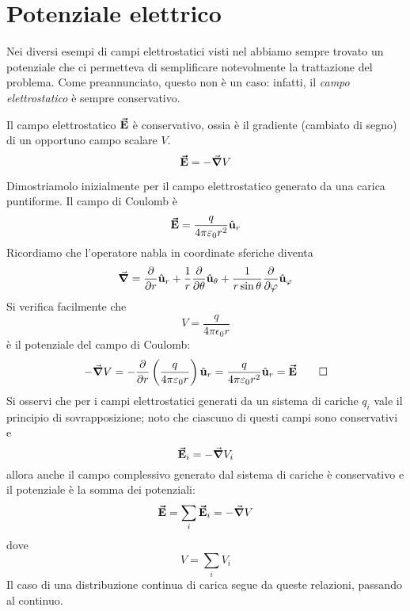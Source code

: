 \section{Potenziale elettrico}
Nei diversi esempi di campi elettrostatici visti nel  abbiamo sempre trovato un potenziale che ci permetteva di semplificare notevolmente la trattazione del problema. Come preannunciato, questo non è un caso: infatti, il \textit{campo elettrostatico} è sempre conservativo.
\begin{theorema}
	Il campo elettrostatico $\vb*{\va{E}}$ è conservativo, ossia è il gradiente (cambiato di segno) di un opportuno campo scalare $V$.
	\begin{equation}
		\vb*{\va{E}}=-\grad{V}
	\end{equation}
\end{theorema}
\begin{demonstration}
	Dimostriamolo inizialmente per il campo elettrostatico generato da una carica puntiforme.
	Il campo di Coulomb è 
\begin{equation*}
	\vb*{\va{E}}=\frac{q}{4\pi\varepsilon_0r^2}\hat{\mathbf{u}}_r
\end{equation*}
Ricordiamo che l'operatore nabla in coordinate sferiche diventa
\begin{equation*}
	\grad =\pdv{r}\hat{\mathbf{u}}_r+\frac{1}{r}\pdv{\theta}\hat{\mathbf{u}}_\theta+\frac{1}{r\sin\theta}\pdv{\varphi}\hat{\mathbf{u}}_\varphi
\end{equation*}
Si verifica facilmente che
\begin{equation}
	V=\frac{q}{4\pi\epsilon_0r}
\end{equation}
è il potenziale del campo di Coulomb:
\begin{equation*}
	-\grad{V}=-\pdv{r}\left(\frac{q}{4\pi\varepsilon_0r}\right)\hat{\mathbf{u}}_r=\frac{q}{4\pi\varepsilon_0r^2}\hat{\mathbf{u}}_r=\vb*{\va{E}}\qedhere
\end{equation*}
Si osservi che per i campi elettrostatici generati da un sistema di cariche $q_i$ vale il principio di sovrapposizione; noto che ciascuno di questi campi sono conservativi e
\begin{equation*}
	\vb*{\va{E}}_i=-\grad{V}_i
\end{equation*}
allora anche il campo complessivo generato dal sistema di cariche è conservativo e il potenziale è la somma dei potenziali:
\begin{equation}
	\vb*{\va{E}}=\sum_i\vb*{\va{E}}_i=-\grad{V}
\end{equation}
dove
\begin{equation}
	V=\sum_iV_i
\end{equation}
Il caso di una distribuzione continua di carica segue da queste relazioni, passando al continuo.
\end{demonstration}
